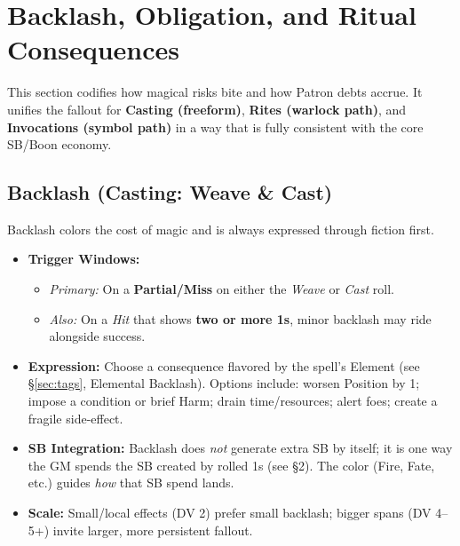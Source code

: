 

\section{Backlash, Obligation, and Ritual Consequences}
\label{sec:backlash-obligation}

This section codifies how magical risks bite and how Patron debts accrue. It unifies the fallout for \textbf{Casting (freeform)}, \textbf{Rites (warlock path)}, and \textbf{Invocations (symbol path)} in a way that is fully consistent with the core SB/Boon economy.

\subsection{Backlash (Casting: Weave \& Cast)}
Backlash colors the cost of magic and is always expressed through fiction first.
\begin{itemize}
  \item \textbf{Trigger Windows:}
    \begin{itemize}
      \item \emph{Primary:} On a \textbf{Partial/Miss} on either the \emph{Weave} or \emph{Cast} roll.
      \item \emph{Also:} On a \emph{Hit} that shows \textbf{two or more 1s}, minor backlash may ride alongside success.
    \end{itemize}
  \item \textbf{Expression:} Choose a consequence flavored by the spell's Element (see \S\ref{sec:tags}, Elemental Backlash). Options include: worsen Position by 1; impose a condition or brief Harm; drain time/resources; alert foes; create a fragile side-effect.
  \item \textbf{SB Integration:} Backlash does \emph{not} generate extra SB by itself; it is one way the GM spends the SB created by rolled 1s (see \S2). The color (Fire, Fate, etc.) guides \emph{how} that SB spend lands.
  \item \textbf{Scale:} Small/local effects (DV 2) prefer small backlash; bigger spans (DV 4--5+) invite larger, more persistent fallout.
\end{itemize}


